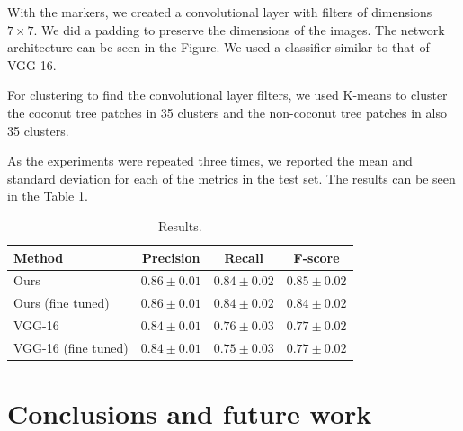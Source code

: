 \documentclass[a4paper,conference]{IEEEtran}
\begin{document}
With the markers, we created a convolutional layer with filters of dimensions $7 \times 7$. We did a padding to preserve the dimensions of the images. The network architecture can be seen in the Figure. We used a classifier similar to that of VGG-16.

For clustering to find the convolutional layer filters, we used K-means to cluster the coconut tree patches in 35 clusters and the non-coconut tree patches in also 35 clusters.

As the experiments were repeated three times, we reported the mean and standard deviation for each of the metrics in the test set. The results can be seen in the Table \ref{tab:results}.

\begin{table}[h]
  \begin{center}
  \begin{tabular}{|l|c|c|c|}
  \hline
   Method & Precision & Recall & F-score \\
  \hline\hline
  Ours & $0.86 \pm 0.01$ & $0.84 \pm 0.02$ & $0.85 \pm 0.02$\\
  Ours (fine tuned) & $0.86 \pm 0.01$ & $0.84 \pm 0.02$ & $0.84 \pm 0.02$\\
  VGG-16 & $0.84 \pm 0.01$ & $0.76 \pm 0.03$ & $0.77 \pm 0.02 $ \\
  VGG-16 (fine tuned) & $0.84 \pm 0.01$ & $0.75 \pm 0.03$ & $0.77 \pm 0.02 $ \\
  \hline
  \end{tabular}
  \end{center}
  \caption{Results.}
  \label{tab:results}
  \end{table}
  

\section{Conclusions and future work}

{\small


}
\end{document}
